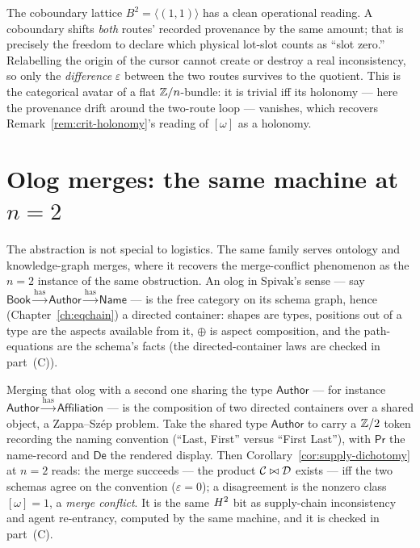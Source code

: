\begin{remark}
\label{rem:supply-gauge}
The coboundary lattice $B^2=\langle(1,1)\rangle$ has a clean operational reading.
A coboundary shifts \emph{both} routes' recorded provenance by the same amount;
that is precisely the freedom to declare which physical lot-slot counts as ``slot
zero.'' Relabelling the origin of the cursor cannot create or destroy a real
inconsistency, so only the \emph{difference} $\varepsilon$ between the two routes
survives to the quotient. This is the categorical avatar of a flat
$\mathbb{Z}/n$-bundle: it is trivial iff its holonomy --- here the provenance drift
around the two-route loop --- vanishes, which recovers
Remark~\ref{rem:crit-holonomy}'s reading of $[\omega]$ as a holonomy.
\end{remark}

\section{Olog merges: the same machine at $n=2$}
\label{sec:supply-olog}

The abstraction is not special to logistics. The same family serves
ontology and knowledge-graph merges, where it recovers the merge-conflict
phenomenon as the $n=2$ instance of the same obstruction. An olog in Spivak's
sense --- say $\mathsf{Book}\xrightarrow{\text{has}}\mathsf{Author}
\xrightarrow{\text{has}}\mathsf{Name}$ --- is the free category on its schema
graph, hence (Chapter~\ref{ch:eqchain}) a directed container: shapes are types,
positions out of a type are the aspects available from it, $\oplus$ is aspect
composition, and the path-equations are the schema's facts (the
directed-container laws are checked in part~(C)).

Merging that olog with a second one sharing the type $\mathsf{Author}$ --- for
instance $\mathsf{Author}\xrightarrow{\text{has}}\mathsf{Affiliation}$ --- is the
composition of two directed containers over a shared object, a Zappa--Sz\'ep
problem. Take the shared type $\mathsf{Author}$ to carry a $\mathbb{Z}/2$ token recording
the naming convention (``Last, First'' versus ``First Last''), with
$\mathsf{Pr}$ the name-record and $\mathsf{De}$ the rendered display. Then
Corollary~\ref{cor:supply-dichotomy} at $n=2$ reads: the merge succeeds --- the
product $\mathcal{C}\bowtie\mathcal{D}$ exists --- iff the two schemas agree on the convention
($\varepsilon=0$); a disagreement is the nonzero class $[\omega]=1$, a
\emph{merge conflict}. It is the same $H^2$ bit as supply-chain inconsistency
and agent re-entrancy, computed by the same machine, and it is checked in
part~(C).

